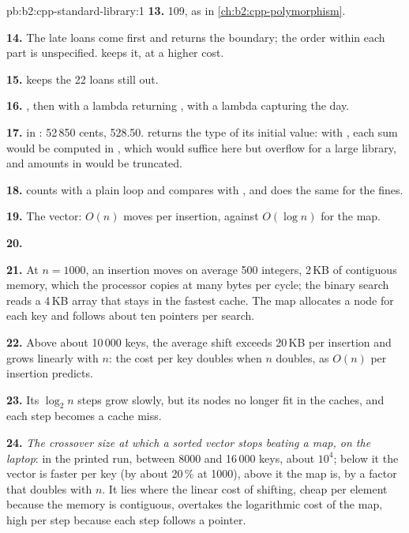 \begin{solution}{pb:b2:cpp-standard-library:1}
\textbf{13.} 109, as in \cref{ch:b2:cpp-polymorphism}.

\textbf{14.} The late loans come first and  returns the boundary; the order within each part is
unspecified.  keeps it, at a higher cost.

\textbf{15.}  keeps the 22 loans still out.

\textbf{16.} , then  with a lambda returning
, with  a lambda capturing the day.

\textbf{17.}  in : 52\,850 cents, 528.50.  returns the type of
its initial value: with , each sum would be computed in , which would suffice here but overflow
for a large library, and amounts in  would be truncated.

\textbf{18.}  counts with a plain loop and compares with , and does the
same for the fines.

\textbf{19.} The vector: $O(n)$ moves per insertion, against $O(\log n)$ for the map.

\textbf{20.} 

\textbf{21.} At $n = 1000$, an insertion moves on average 500 integers, 2\,KB of contiguous memory, which the
processor copies at many bytes per cycle; the binary search reads a 4\,KB array that stays in the fastest cache.
The map allocates a node for each key and follows about ten pointers per search.

\textbf{22.} Above about 10\,000 keys, the average shift exceeds 20\,KB per insertion and grows linearly with $n$:
the cost per key doubles when $n$ doubles, as $O(n)$ per insertion predicts.

\textbf{23.} Its $\log_2 n$ steps grow slowly, but its nodes no longer fit in the caches, and each step becomes a
cache miss.

\textbf{24.} \emph{The crossover size at which a sorted vector stops beating a map, on the laptop}: in the printed
run, between 8000 and 16\,000 keys, about $10^4$; below it the vector is faster per key (by about 20\,\% at
1000), above it the map is, by a factor that doubles with $n$. It lies where the linear cost of shifting,
cheap per element because the memory is contiguous, overtakes the logarithmic cost of the map, high per step
because each step follows a pointer.
\end{solution}
